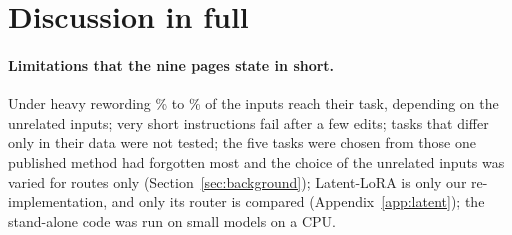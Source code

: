 \FloatBarrier
\section{Discussion in full}
\label{sec:discussion}



\paragraph{Limitations that the nine pages state in short.} Under heavy rewording \BackgroundHeavyLow{}\% to \BackgroundHeavyHigh{}\% of the inputs reach their task, depending on the unrelated inputs; very short instructions fail after a few edits; tasks that differ only in their data were not tested; the five tasks were chosen from those one published method had forgotten most and the choice of the unrelated inputs was varied for routes only (Section~\ref{sec:background}); Latent-LoRA is only our re-implementation, and only its router is compared (Appendix~\ref{app:latent}); the stand-alone code was run on small models on a CPU.
